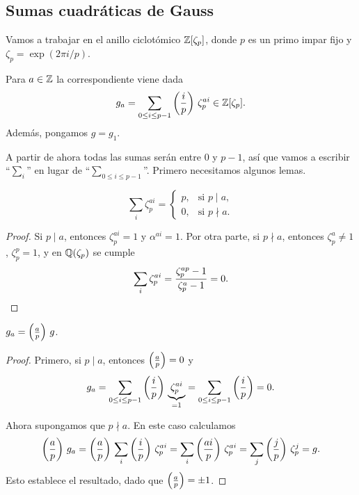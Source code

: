 \subsection{Sumas cuadráticas de Gauss}

Vamos a trabajar en el anillo ciclotómico $\mathbb{Z} [\zeta_p]$, donde $p$ es un primo
impar fijo y $\zeta_p = \exp (2\pi i/p)$.

\begin{definicion}
  Para $a \in \mathbb{Z}$ la  correspondiente viene dada
  $$g_a = \sum_{0 \le i \le p-1} \left(\frac{i}{p}\right) \, \zeta_p^{ai} \in \mathbb{Z} [\zeta_p].$$
  Además, pongamos $g = g_1$.
\end{definicion}

A partir de ahora todas las sumas serán entre $0$ y $p-1$, así que vamos
a escribir ``$\sum_i$'' en lugar de ``$\sum_{0 \le i \le p-1}$''.
Primero necesitamos algunos lemas.

\begin{lema}
  \label{lema:QR-1}
  \[ \sum_i \zeta_p^{ai} = \begin{cases}
    p, & \text{si } p \mid a,\\
    0, & \text{si } p \nmid a.
  \end{cases} \]

  \begin{proof}
    Si $p \mid a$, entonces $\zeta_p^{ai} = 1$ y $\alpha^{ai} = 1$.
    Por otra parte, si $p \nmid a$, entonces $\zeta_p^a \ne 1$, $\zeta_p^p = 1$,
    y en $\mathbb{Q} (\zeta_p)$ se cumple
    \[ \sum_i \zeta_p^{ai} = \frac{\zeta_p^{ap} - 1}{\zeta_p^a - 1} = 0. \qedhere \]
  \end{proof}
\end{lema}

\begin{lema}
  \label{lema:QR-2}
  $g_a = \left(\frac{a}{p}\right)\,g$.

  \begin{proof}
    Primero, si $p\mid a$, entonces $\left(\frac{a}{p}\right) = 0$ y
    \[ g_a =
       \sum_{0 \le i \le p-1} \left(\frac{i}{p}\right) \, \underbrace{\zeta_p^{ai}}_{= 1} =
       \sum_{0 \le i \le p-1} \left(\frac{i}{p}\right) = 0. \]

    Ahora supongamos que $p \nmid a$. En este caso calculamos
    \[ \left(\frac{a}{p}\right)\,g_a =
       \left(\frac{a}{p}\right)\,\sum_i \left(\frac{i}{p}\right)\,\zeta_p^{ai} =
       \sum_i \left(\frac{ai}{p}\right)\,\zeta_p^{ai} =
       \sum_j \left(\frac{j}{p}\right)\,\zeta_p^{j} = g. \]
    Esto establece el resultado, dado que $\left(\frac{a}{p}\right) = \pm 1$.
  \end{proof}
\end{lema}

